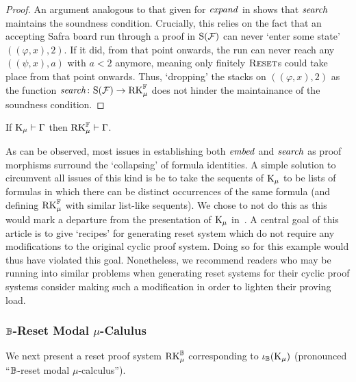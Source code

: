\begin{proof}
  An argument analogous to that given for $\mathit{expand}$ in  shows that
  $\mathit{search}$ maintains the soundness condition. Crucially, this relies on the
  fact that an accepting Safra board run through a proof in $\mathrm{S}(\mathcal{F})$ can
  never `enter some state' $((\varphi, x), 2)$. If it did, from that point onwards, the run can
  never reach any $((\psi, x), a)$ with $a < 2$ anymore, meaning only finitely
  $\textsc{Reset}$s could take place from that point onwards. Thus, `dropping' the
  stacks on $((\varphi, x), 2)$ as the function $\mathit{search} \colon \mathrm{S}(\mathcal{F}) \to \mathrm{RK}_\mu^{\mathbb{F}}$
  does not hinder the maintainance of the soundness condition.
\end{proof}

\begin{corollary}[Completeness]\label{lem:frmml-complete}
  If $\mathrm{K}_\mu \vdash \Gamma$ then $\mathrm{RK}_\mu^{\mathbb{F}} \vdash
  \Gamma$.
\end{corollary}

As can be observed, most issues in establishing both $\mathit{embed}$ and $\mathit{search}$ as
proof morphisms surround the `collapsing' of formula identities. A simple
solution to circumvent all issues of this kind is be to take the sequents of
$\mathrm{K}_\mu$ to be lists of formulas in which there can be distinct occurrences of the
same formula (and defining $\mathrm{RK}_\mu^{\mathbb{F}}$ with similar list-like sequents). We chose
to not do this as this would mark a departure from the presentation of $\mathrm{K}_\mu$
in~\parencite{afshariCutfreeCompletenessModal2017}. A central goal of this article is
to give `recipes' for generating reset system which do not require any
modifications to the original cyclic proof system. Doing so for this example
would thus have violated this goal. Nonetheless, we recommend readers who may be
running into similar problems when generating reset systems for their cyclic
proof systems consider making such a modification in order to lighten their
proving load.


\subsubsection{$\mathbb{B}$-Reset Modal $\mu$-Calulus}
\label{sec:boolean-mu}

We next present a reset proof system $\mathrm{RK}_\mu^{\mathbb{B}}$ corresponding to $\iota_{\mathbb{B}}(\mathrm{K}_\mu)$
(pronounced ``$\mathbb{B}$-reset modal $\mu$-calculus'').

